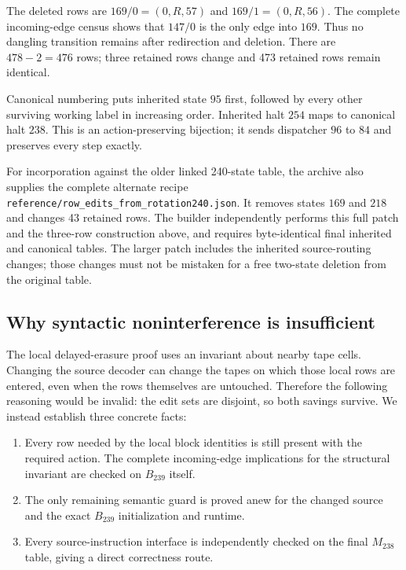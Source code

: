 \documentclass[11pt]{article}
\theoremstyle{definition}\newtheorem{definition}[theorem]{Definition}
\newcommand{\file}[1]{\nolinkurl{#1}}
\begin{document}
The deleted rows are $169/0=(0,R,57)$ and $169/1=(0,R,56)$.
The complete incoming-edge census shows that $147/0$ is the only edge into
$169$.  Thus no dangling transition remains after redirection and deletion.
There are $478-2=476$ rows; three retained rows change and 473 retained rows
remain identical.

Canonical numbering puts inherited state $95$ first, followed by every
other surviving working label in increasing order.  Inherited halt $254$
maps to canonical halt $238$.  This is an action-preserving bijection;
it sends dispatcher $96$ to $84$ and preserves every step exactly.

For incorporation against the older linked 240-state table, the archive
also supplies the complete alternate recipe
\file{reference/row_edits_from_rotation240.json}.  It removes states $169$
and $218$ and changes 43 retained rows.  The builder independently performs
this full patch and the three-row construction above, and requires
byte-identical final inherited and canonical tables.  The larger patch
includes the inherited source-routing changes; those changes must not be
mistaken for a free two-state deletion from the original table.

\subsection{Why syntactic noninterference is insufficient}

The local delayed-erasure proof uses an invariant about nearby tape cells.
Changing the source decoder can change the tapes on which those local rows
are entered, even when the rows themselves are untouched.  Therefore the
following reasoning would be invalid: the edit sets are disjoint, so both
savings survive.  We instead establish three concrete facts:

\begin{enumerate}
\item Every row needed by the local block identities is still present with
the required action.  The complete incoming-edge implications for the
structural invariant are checked on $B_{239}$ itself.
\item The only remaining semantic guard is proved anew for the changed
source and the exact $B_{239}$ initialization and runtime.
\item Every source-instruction interface is independently checked on the
final $M_{238}$ table, giving a direct correctness route.
\end{enumerate}
\end{document}
